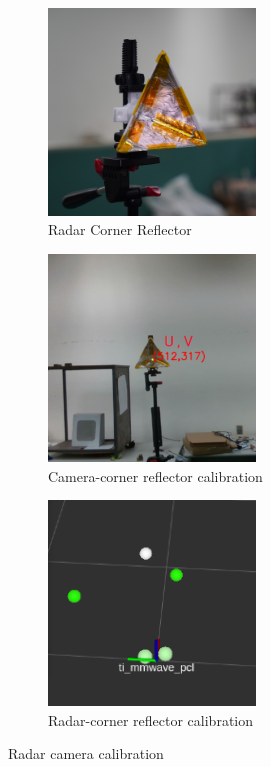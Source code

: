 \begin{figure}[hbpt]
    \centering
    \begin{subfigure}{0.25\linewidth}
        \includegraphics[width=5.5cm]{Figures/corner_reflector.jpg}
        \caption{Radar Corner Reflector}
        \label{subfig:corner_reflector_fig}
    \end{subfigure}
    \hfill
    \begin{subfigure}{0.25\linewidth}
        \centering
        \includegraphics[width=5.5cm]{Figures/camera_corner.png}
        \caption{Camera-corner reflector calibration}
        \label{subfig:camera_view_fig}
    \end{subfigure}
    \hfill
    \begin{subfigure}{0.25\linewidth}
        \centering
        \includegraphics[width=5.5cm]{Figures/radar_corner.png}
        \caption{Radar-corner reflector calibration}
        \label{subfig:radar_view_fig}
    \end{subfigure}

    \caption{Radar camera calibration}
    \label{fig:radar_camera_calibration}
\end{figure}

